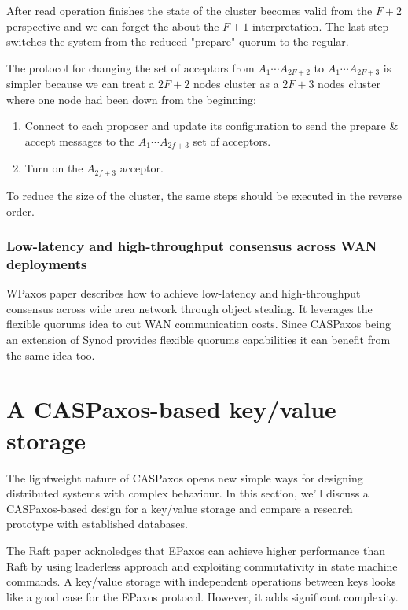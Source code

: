 \documentclass[12pt]{article}
\theoremstyle{definition}
\begin{document}
After read operation finishes the state of the cluster becomes valid from the $F+2$ perspective and we can forget the about the $F+1$ interpretation. The last step switches the system from the reduced "prepare" quorum to the regular.

The protocol for changing the set of acceptors from $A_1 \cdots A_{2F+2}$ to $A_1 \cdots A_{2F+3}$ is simpler because we can treat a $2F+2$ nodes cluster as a $2F+3$ nodes cluster where one node had been down from the beginning:
\begin{enumerate}
  \item Connect to each proposer and update its configuration to send the prepare \& accept messages to the $A_1 \cdots A_{2f+3}$ set of acceptors.
  \item Turn on the $A_{2f+3}$ acceptor.
\end{enumerate}

To reduce the size of the cluster, the same steps should be executed in the reverse order.

\subsubsection{Low-latency and high-throughput consensus across WAN deployments}

WPaxos\cite{wpaxos} paper describes how to achieve low-latency and high-throughput consensus across wide area network through object stealing. It leverages the flexible quorums\cite{fpaxos} idea to cut WAN communication costs. Since CASPaxos being an extension of Synod provides flexible quorums capabilities it can benefit from the same idea too.

\section{A CASPaxos-based key/value storage}

The lightweight nature of CASPaxos opens new simple ways for designing distributed systems with complex behaviour. In this section, we'll discuss a CASPaxos-based design for a key/value storage and compare a research prototype with established databases.

The Raft paper acknoledges\cite{raft} that EPaxos\cite{epaxos} can achieve higher performance than Raft by using leaderless approach and exploiting commutativity in state machine commands. A key/value storage with independent operations between keys looks like a good case for the EPaxos protocol. However, it adds significant complexity.
\end{document}
